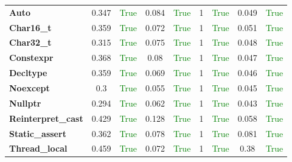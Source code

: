 \documentclass{article}
\begin{document}
\begin{xltabular}{\textwidth}{lcccccccc}
\textbf{{\fontsize{10}{12}\selectfont Auto}}& 0.347&\textcolor{green}{True}& 0.084&\textcolor{green}{True}& 1&\textcolor{green}{True}& 0.049&\textcolor{green}{True} \\[0.5ex]
\textbf{{\fontsize{10}{12}\selectfont Char16\_t}}& 0.359&\textcolor{green}{True}& 0.072&\textcolor{green}{True}& 1&\textcolor{green}{True}& 0.051&\textcolor{green}{True} \\[0.5ex]
\textbf{{\fontsize{10}{12}\selectfont Char32\_t}}& 0.315&\textcolor{green}{True}& 0.075&\textcolor{green}{True}& 1&\textcolor{green}{True}& 0.048&\textcolor{green}{True} \\[0.5ex]
\textbf{{\fontsize{10}{12}\selectfont Constexpr}}& 0.368&\textcolor{green}{True}& 0.08&\textcolor{green}{True}& 1&\textcolor{green}{True}& 0.047&\textcolor{green}{True} \\[0.5ex]
\textbf{{\fontsize{10}{12}\selectfont Decltype}}& 0.359&\textcolor{green}{True}& 0.069&\textcolor{green}{True}& 1&\textcolor{green}{True}& 0.046&\textcolor{green}{True} \\[0.5ex]
\textbf{{\fontsize{10}{12}\selectfont Noexcept}}& 0.3&\textcolor{green}{True}& 0.055&\textcolor{green}{True}& 1&\textcolor{green}{True}& 0.045&\textcolor{green}{True} \\[0.5ex]
\textbf{{\fontsize{10}{12}\selectfont Nullptr}}& 0.294&\textcolor{green}{True}& 0.062&\textcolor{green}{True}& 1&\textcolor{green}{True}& 0.043&\textcolor{green}{True} \\[0.5ex]
\textbf{{\fontsize{10}{12}\selectfont Reinterpret\_cast}}& 0.429&\textcolor{green}{True}& 0.128&\textcolor{green}{True}& 1&\textcolor{green}{True}& 0.058&\textcolor{green}{True} \\[0.5ex]
\textbf{{\fontsize{10}{12}\selectfont Static\_assert}}& 0.362&\textcolor{green}{True}& 0.078&\textcolor{green}{True}& 1&\textcolor{green}{True}& 0.081&\textcolor{green}{True} \\[0.5ex]
\textbf{{\fontsize{10}{12}\selectfont Thread\_local}}& 0.459&\textcolor{green}{True}& 0.072&\textcolor{green}{True}& 1&\textcolor{green}{True}& 0.38&\textcolor{green}{True} \\[0.5ex]
\bottomrule
\end{xltabular}
\newpage
\end{document}
